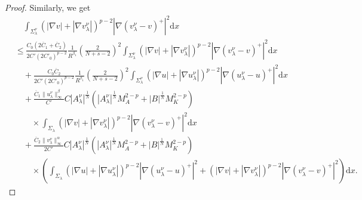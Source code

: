 \documentclass[12pt]{amsart}
\theoremstyle{definition}
\theoremstyle{remark}
\theoremstyle{conclusion}
\theoremstyle{conjecture}
\numberwithin{equation}{section}
\begin{document}
\begin{proof}
Similarly, we get
\begin{align}\label{eq1204-}
&\quad\int_{\Sigma^{\nu}_\lambda} (|\nabla v|+|\nabla v^{\nu}_{\lambda}|)^{p-2} |\nabla(v^{\nu}_{\lambda}-v)^+|^2 \mathrm{d}x \\
&\leq \frac{C_0(2\overline{C}_1+\overline{C}_2)}{2C'(2C'_0)^{p-2}} \frac{1}{R^{\beta_1}}\left(\frac{2}{N+s-2}\right)^2 \int_{\Sigma_\lambda^\nu}(|\nabla v|+|\nabla v^{\nu}_{\lambda}|)^{p-2} |\nabla (v^{\nu}_{\lambda}-v)^+|^2 \mathrm{d}x \nonumber\\
& \quad +\frac{ C_0\overline{C}_2}{2C'(2C'_0)^{p-2}}\frac{1}{R^{\beta_1}}\left(\frac{2}{N+s-2}\right)^2\int_{\Sigma_\lambda^\nu} (|\nabla u|+|\nabla u^{\nu}_{\lambda}|)^{p-2} |\nabla(u^{\nu}_{\lambda}-u )^+|^2 \mathrm{d}x  \nonumber\\
&\quad + \frac{\overline{C}_1\|u^\nu_\lambda\|^\beta_\infty }{C'}C |A_\lambda^\nu|^\frac{1}{N} \left( |A_\lambda^\nu|^\frac{1}{N} M_A^{2-p}+ |B|^\frac{1}{N} M_K^{2-p} \right)  \nonumber\\
&\quad \quad\times \int_{\Sigma_\lambda} (|\nabla v|+|\nabla v^{\nu}_{\lambda}|)^{p-2} |\nabla(v^{\nu}_{\lambda}-v )^+|^2 \mathrm{d}x \nonumber\\
 &\quad +\frac{\overline{C}_2\|v^\nu_\lambda\|^\alpha_\infty }{2C'}C |A_\lambda^\nu|^\frac{1}{N} \left(  |A_\lambda^\nu|^\frac{1}{N} M_A^{2-p}+|B|^\frac{1}{N} M_K^{2-p} \right)  \nonumber\\
&\quad \quad \times \left(\int_{\Sigma_\lambda} (|\nabla u|+|\nabla u^{\nu}_{\lambda}|)^{p-2} |\nabla(u^{\nu}_{\lambda}-u )^+|^2 +(|\nabla v|+|\nabla v^{\nu}_{\lambda}|)^{p-2} |\nabla(v^{\nu}_{\lambda}-v )^+|^2\right)\mathrm{d}x. \nonumber
\end{align}


\end{proof}
\end{document}
